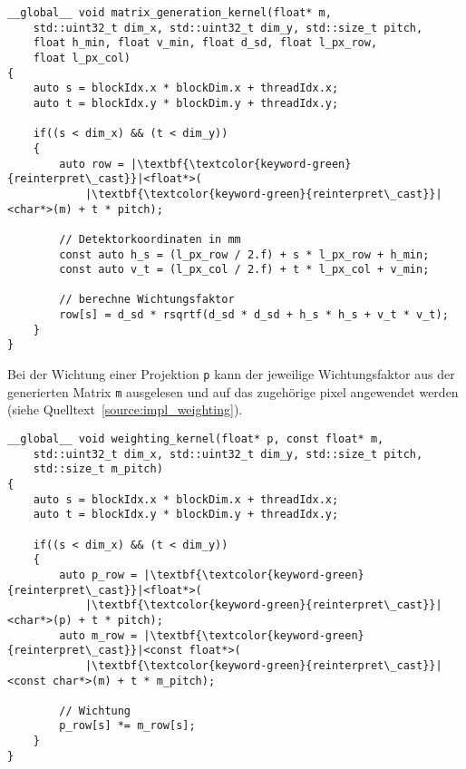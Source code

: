\begin{code}
\begin{verbatim}
__global__ void matrix_generation_kernel(float* m,
    std::uint32_t dim_x, std::uint32_t dim_y, std::size_t pitch,
    float h_min, float v_min, float d_sd, float l_px_row,
    float l_px_col)
{
    auto s = blockIdx.x * blockDim.x + threadIdx.x;
    auto t = blockIdx.y * blockDim.y + threadIdx.y;

    if((s < dim_x) && (t < dim_y))
    {
        auto row = |\textbf{\textcolor{keyword-green}{reinterpret\_cast}}|<float*>(
            |\textbf{\textcolor{keyword-green}{reinterpret\_cast}}|<char*>(m) + t * pitch);

        // Detektorkoordinaten in mm
        const auto h_s = (l_px_row / 2.f) + s * l_px_row + h_min;
        const auto v_t = (l_px_col / 2.f) + t * l_px_col + v_min;

        // berechne Wichtungsfaktor
        row[s] = d_sd * rsqrtf(d_sd * d_sd + h_s * h_s + v_t * v_t);
    }
}
\end{verbatim}
\label{source:impl_gen_mat}
\end{code}

Bei der Wichtung einer Projektion \texttt{p} kann der jeweilige Wichtungsfaktor aus der generierten Matrix \texttt{m}
ausgelesen und auf das zugehörige \gls{pixel} angewendet werden (siehe Quelltext~\ref{source:impl_weighting}). 

\begin{code}
\begin{verbatim}
__global__ void weighting_kernel(float* p, const float* m,
    std::uint32_t dim_x, std::uint32_t dim_y, std::size_t pitch,
    std::size_t m_pitch)
{
    auto s = blockIdx.x * blockDim.x + threadIdx.x;
    auto t = blockIdx.y * blockDim.y + threadIdx.y;

    if((s < dim_x) && (t < dim_y))
    {
        auto p_row = |\textbf{\textcolor{keyword-green}{reinterpret\_cast}}|<float*>(
            |\textbf{\textcolor{keyword-green}{reinterpret\_cast}}|<char*>(p) + t * pitch);
        auto m_row = |\textbf{\textcolor{keyword-green}{reinterpret\_cast}}|<const float*>(
            |\textbf{\textcolor{keyword-green}{reinterpret\_cast}}|<const char*>(m) + t * m_pitch);

        // Wichtung
        p_row[s] *= m_row[s];
    }
}
\end{verbatim}
\label{source:impl_weighting}
\end{code}

